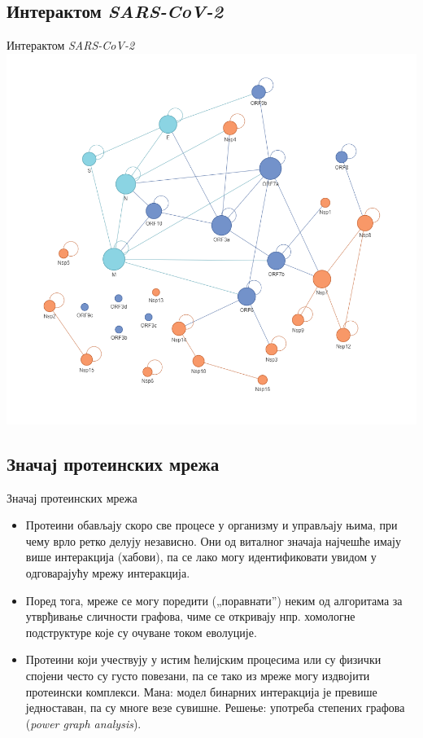 \documentclass[hyperref={bookmarks=false}]{beamer}
\begin{document}
\subsection{Интерактом \textit{SARS-CoV-2}}
\begin{frame}{Интерактом \textit{SARS-CoV-2}}
\centering\includegraphics[width=.75\textwidth]{SARS_iRef.png}
\end{frame}

\subsection{Значај протеинских мрежа}
\begin{frame}{Значај протеинских мрежа}
\begin{itemize}
	\item Протеини обављају скоро све процесе у организму и управљају њима, при чему врло ретко делују независно. Они од виталног значаја најчешће имају више интеракција (хабови), па се лако могу идентификовати увидом у одговарајућу мрежу интеракција.

	\item Поред тога, мреже се могу поредити („поравнати”) неким од алгоритама за утврђивање сличности графова, чиме се откривају нпр. хомологне подструктуре које су очуване током еволуције.

	\item Протеини који учествују у истим ћелијским процесима или су физички спојени често су густо повезани, па се тако из мреже могу издвојити протеински комплекси. Мана: модел бинарних интеракција је превише једноставан, па су многе везе сувишне. Решење: употреба степених графова (\textit{power graph analysis}).
\end{itemize}
\end{frame}
\end{document}
